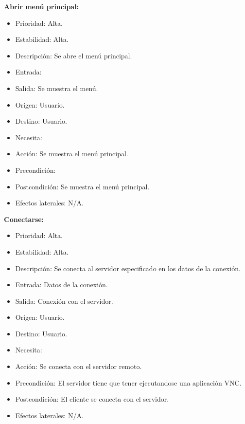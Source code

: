 \textbf{Abrir menú principal:}
\begin{itemize}
\item Prioridad: Alta.
\item Estabilidad: Alta.
\item Descripción: Se abre el menú principal.
\item Entrada:
\item Salida: Se muestra el menú.
\item Origen: Usuario.
\item Destino: Usuario.
\item Necesita:
\item Acción: Se muestra el menú principal.
\item Precondición:
\item Postcondición: Se muestra el menú principal.
\item Efectos laterales: N/A.\\

\end{itemize}

\textbf{Conectarse:}

\begin{itemize}
\item Prioridad: Alta.
\item Estabilidad: Alta.
\item Descripción: Se conecta al servidor especificado en los datos de la conexión.
\item Entrada: Datos de la conexión.
\item Salida: Conexión con el servidor.
\item Origen: Usuario.
\item Destino: Usuario.
\item Necesita:
\item Acción: Se conecta con el servidor remoto.
\item Precondición: El servidor tiene que tener ejecutandose una aplicación VNC.
\item Postcondición: El cliente se conecta con el servidor.
\item Efectos laterales: N/A.\\

\end{itemize}

